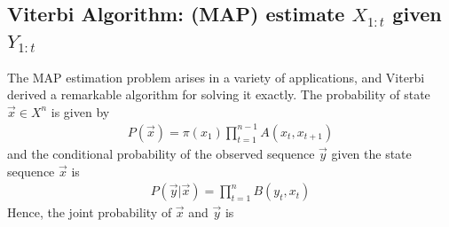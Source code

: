 \documentclass[11pt,a4paper]{article}
\begin{document}
\subsection{Viterbi Algorithm: (MAP) estimate $X_{1:t}$ given $Y_{1:t}$}
The MAP estimation problem arises in a variety of applications, and Viterbi derived a remarkable algorithm for solving it exactly. The probability of state $\vec{x}\in X^n$ is given by
\begin{equation}
    \begin{aligned}
        P(\vec{x})=\pi(x_1)\prod_{t=1}^{n-1}A(x_t,x_{t+1})
    \end{aligned}
    \nonumber
\end{equation}
and the conditional probability of the observed sequence $\vec{y}$ given the state sequence $\vec{x}$ is
\begin{equation}
    \begin{aligned}
        P(\vec{y}|\vec{x})=\prod_{t=1}^n B(y_t,x_t)
    \end{aligned}
    \nonumber
\end{equation}
Hence, the joint probability of $\vec{x}$ and $\vec{y}$ is
\end{document}
